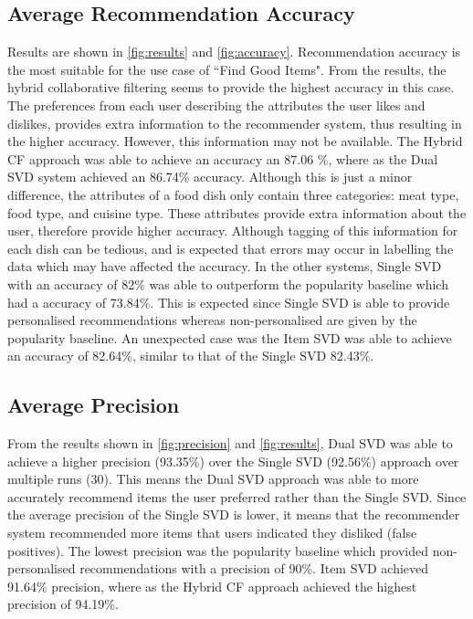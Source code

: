 \subsection{Average Recommendation Accuracy}
Results are shown in \ref{fig:results} and \ref{fig:accuracy}. Recommendation accuracy is the most suitable for the use case of ``Find Good Items". From the results, the hybrid collaborative filtering seems to provide the highest accuracy in this case. The preferences from each user describing the attributes the user likes and dislikes, provides extra information to the recommender system, thus resulting in the higher accuracy. However, this information may not be available. The Hybrid CF approach was able to achieve an accuracy an 87.06 \%, where as the Dual SVD system achieved an 86.74\% accuracy. Although this is just a minor difference, the attributes of a food dish only contain three categories: meat type, food type, and cuisine type. These attributes provide extra information about the user, therefore provide higher accuracy. Although tagging of this information for each dish can be tedious, and is expected that errors may occur in labelling the data which may have affected the accuracy. In the other systems, Single SVD with an accuracy of 82\% was able to outperform the popularity baseline which had a accuracy of 73.84\%. This is expected since Single SVD is able to provide personalised recommendations whereas non-personalised are given by the popularity baseline. An unexpected case was the Item SVD was able to achieve an accuracy of 82.64\%, similar to that of the Single SVD 82.43\%. 

\subsection{Average Precision}

 From the results shown in \ref{fig:precision} and \ref{fig:results}, Dual SVD was able to achieve a higher precision (93.35\%) over the Single SVD (92.56\%) approach over multiple runs (30). This means the Dual SVD approach was able to more accurately recommend items the user preferred rather than the Single SVD. Since the average precision of the Single SVD is lower, it means that the recommender system recommended more items that users indicated they disliked (false positives). The lowest precision was the popularity baseline which provided non-personalised recommendations with a precision of 90\%. Item SVD achieved 91.64\% precision, where as the Hybrid CF approach achieved the highest precision of 94.19\%. 

